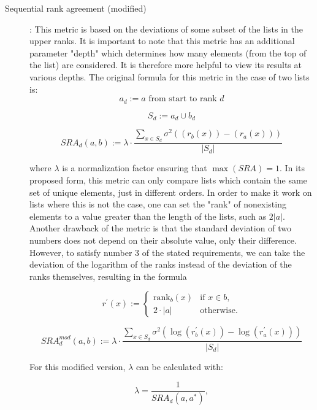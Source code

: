 \begin{description}
	\item [Sequential rank agreement (modified)] \cite{ekstromSequentialRankAgreement2015}: This metric is based on the deviations of some subset of the lists in the upper ranks.
	      It is important to note that this metric has an additional parameter "depth" which determines how many elements (from the top of the list) are considered.
	      It is therefore more helpful to view its results at various depths.
	      The original formula for this metric in the case of two lists is:
	      \[
		      a_{d} := a \text{ from start to rank } d
	      \]

	      \[
		      S_{d} := a_{d} \cup b_{d}
	      \]

	      \[
		      SRA_{d}(a, b) := \lambda \cdot \frac{\sum_{x \in S_{d}} \sigma ^2 \left( \left( r_{b}(x) \right) - \left( r_{a}(x) \right) \right)}{|S_{d}|}
	      \]

	      where \(\lambda\) is a normalization factor ensuring that \(\max(SRA) = 1\).
	      In its proposed form, this metric can only compare lists which contain the same set of unique elements, just in different orders.
	      In order to make it work on lists where this is not the case, one can set the "rank" of nonexisting elements to a value greater than the length of the lists, such as \(2 |a|\).
	      Another drawback of the metric is that the standard deviation of two numbers does not depend on their absolute value, only their difference.
	      However, to satisfy number 3 of the stated requirements, we can take the deviation of the logarithm of the ranks instead of the deviation of the ranks themselves, resulting in the formula

	      \[
		      r^{\prime}(x) :=
		      \begin{cases}
			      \mathrm{rank}_{b}(x) & \text{if } x \in b, \\
			      2 \cdot |a|          & \text{otherwise.}
		      \end{cases}
	      \]

	      \[
		      SRA^{mod}_{d}(a, b) := \lambda \cdot \frac{\sum_{x \in S_{d}} \sigma ^2 \left( \log (r^{\prime}_{b}(x))-\log(r^{\prime}_{a}(x))\right)}{|S_{d}|}
	      \]

	      For this modified version, \(\lambda\) can be calculated with:

	      \[
		      \lambda = \frac{1}{SRA_{d}(a, a^{*})},
	      \]


\end{description}
